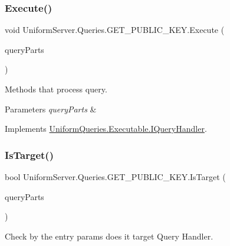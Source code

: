 \subsubsection{\texorpdfstring{Execute()}{Execute()}}
{\footnotesize\ttfamily void Uniform\+Server.\+Queries.\+G\+E\+T\+\_\+\+P\+U\+B\+L\+I\+C\+\_\+\+K\+E\+Y.\+Execute (\begin{DoxyParamCaption}\item[{\mbox{\hyperlink{struct_uniform_queries_1_1_query_part}{Query\+Part}} \mbox{[}$\,$\mbox{]}}]{query\+Parts }\end{DoxyParamCaption})}



Methods that process query. 


\begin{DoxyParams}{Parameters}
{\em query\+Parts} & \\
\hline
\end{DoxyParams}


Implements \mbox{\hyperlink{interface_uniform_queries_1_1_executable_1_1_i_query_handler_a3268d72c0388f5e3debba4d73bdfe523}{Uniform\+Queries.\+Executable.\+I\+Query\+Handler}}.

\mbox{\label{class_uniform_server_1_1_queries_1_1_g_e_t___p_u_b_l_i_c___k_e_y_ae27d462fe9ccbbf22ac03c9ead9cbe8f}} 
\subsubsection{\texorpdfstring{Is\+Target()}{IsTarget()}}
{\footnotesize\ttfamily bool Uniform\+Server.\+Queries.\+G\+E\+T\+\_\+\+P\+U\+B\+L\+I\+C\+\_\+\+K\+E\+Y.\+Is\+Target (\begin{DoxyParamCaption}\item[{\mbox{\hyperlink{struct_uniform_queries_1_1_query_part}{Query\+Part}} \mbox{[}$\,$\mbox{]}}]{query\+Parts }\end{DoxyParamCaption})}



Check by the entry params does it target Query Handler. 


